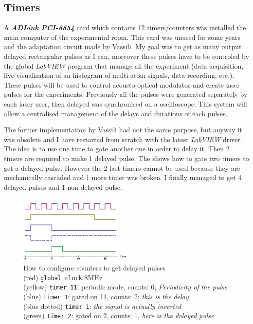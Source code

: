 \documentclass[twoside, open=right
]{scrreprt}
\begin{document}
\subsection{Timers}

\par A \emph{\textbf{ADLink PCI-8854}} card which contains 12 timers/counters was installed the main computer of the experimental room. This card was unused for some years and the adaptation circuit made by Vassili. My goal was to get as many output delayed rectangular pulses as I can, moreover these pulses have to be controled by the global \emph{LabVIEW} program that manage all the experiment (data acquisition, live visualisation of an histogram of multi-atom signals, data recording, etc.). These pulses will be used to control acousto-optical-modulator and create laser pulses for the experiments. Previously all the pulses were generated separately by each laser user, then delayed was synchronised on a oscilloscope. This system will allow a centralised management of the delays and durations of each pulses.

\par The former implementation by Vassili had not the same purpose, but anyway it was obsolete and I have restarted from scratch with the latest \emph{LabVIEW} driver. The idea is to use one time to gate another one in order to delay it. Then 2 timers are required to make 1 delayed pulse. The  shows how to gate two timers to get a delayed pulse. However the 2 last timers cannot be used because they are mechanically cascaded and 1 more timer was broken. I finally managed to get 4 delayed pulses and 1 non-delayed pulse. 

\begin{figure}[h]
  \centering
  \includegraphics[width=0.5\textwidth]{timers.pdf}
  \caption{\label{timers}How to configure counters to get delayed pulses\\
(red) \texttt{global clock} 8MHz \\
(yellow) \texttt{timer 11}: periodic mode, counts: 6; \emph{Periodicity of the pulse}\\
(blue) \texttt{timer 1}: gated on 11, counts: 2; \emph{this is the delay}\\
(blue dotted) \texttt{timer 1}: \emph{the signal is actually inverted} \\
(green) \texttt{timer 2}: gated on 2, counts: 1, \emph{here is the delayed pulse}}
\end{figure}
\end{document}

